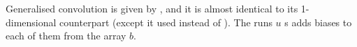 Generalised convolution is given by , and it is almost identical to its
1-dimensional counterpart (except it used  instead of ).
The  runs $u$ s adds biases to each of them from the array $b$.
\begin{code}[hide]%
\>[0]\AgdaSpace{}%
\AgdaSpace{}%
\<%
\\
\>[0][@{}l@{\AgdaIndent{0}}]%
\>[2]\AgdaSpace{}%
\AgdaSpace{}%
\AgdaSpace{}%
\AgdaSpace{}%
\AgdaSpace{}%
\AgdaSpace{}%
\AgdaSymbol{(}\AgdaSymbol{)}\<%
\\
%
\>[2]\AgdaSpace{}%
\AgdaSpace{}%
\AgdaSpace{}%
\AgdaSpace{}%
\AgdaSpace{}%
\AgdaSpace{}%
\AgdaSymbol{(}\AgdaPrimitive{\AgdaUnderscore{}+\AgdaUnderscore{}}\AgdaSymbol{;}\AgdaSpace{}%
\AgdaPrimitive{\AgdaUnderscore{}*\AgdaUnderscore{}}\AgdaSymbol{;}\AgdaSpace{}%
\AgdaSymbol{;}\AgdaSpace{}%
\AgdaSymbol{;}\AgdaSpace{}%
\AgdaPrimitive{-\AgdaUnderscore{}}\AgdaSymbol{;}\AgdaSpace{}%
\AgdaSymbol{)}\AgdaSpace{}%
\AgdaSpace{}%
\AgdaSymbol{(}\AgdaSpace{}%
\AgdaSpace{}%
\AgdaSymbol{)}\<%
\\
%
\>[2]\AgdaSpace{}%
\<%
\end{code}
